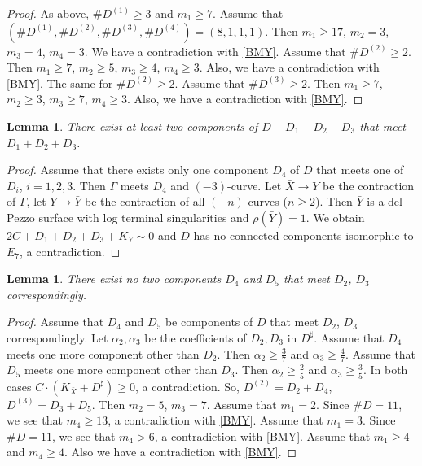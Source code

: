 \documentclass[10pt,oneside,reqno]{amsart}
\newtheorem{lemma}[theorem]{Lemma}
\theoremstyle{definition}
\theoremstyle{remark}
\numberwithin{equation}{section}
\begin{document}
\begin{proof}
As above, $\# D^{(1)}\geq 3$ and $m_1\geq 7$. Assume that $(\# D^{(1)},\# D^{(2)},\# D^{(3)},\# D^{(4)})=(8,1,1,1)$. Then $m_1\geq 17$, $m_2=3$, $m_3=4$, $m_4=3$. We have a contradiction with \ref{BMY}. Assume that $\# D^{(2)}\geq 2$. Then $m_1\geq 7$, $m_2\geq 5$, $m_3\geq 4$, $m_4\geq 3$. Also, we have a contradiction with \ref{BMY}. The same for $\# D^{(2)}\geq 2$. Assume that $\# D^{(3)}\geq 2$. Then $m_1\geq 7$, $m_2\geq 3$, $m_3\geq 7$, $m_4\geq 3$. Also, we have a contradiction with \ref{BMY}.
\end{proof}

\begin{lemma}
\label{Case234-4}
There exist at least two components of $D-D_1-D_2-D_3$ that meet $D_1+D_2+D_3$.
\end{lemma}

\begin{proof}
Assume that there exists only one component $D_4$ of $D$ that meets one of $D_i$, $i=1,2,3$. Then $\Gamma$ meets $D_4$ and $(-3)$-curve. Let $\bar{X}\rightarrow Y$ be the contraction of $\Gamma$, let $Y\rightarrow\bar{Y}$ be the contraction of all $(-n)$-curves ($n\geq 2$). Then $\bar{Y}$ is a del Pezzo surface with log terminal singularities and $\rho(\bar{Y})=1$. We obtain $2C+D_1+D_2+D_3+K_{Y}\sim 0$ and $D$ has no connected components isomorphic to $E_7$, a contradiction.
\end{proof}

\begin{lemma}
\label{Case234-5}
There exist no two components $D_4$ and $D_5$ that meet $D_2$, $D_3$ correspondingly.
\end{lemma}

\begin{proof}
Assume that $D_4$ and $D_5$ be components of $D$ that meet $D_2$, $D_3$ correspondingly. Let $\alpha_2,\alpha_3$ be the coefficients of $D_2, D_3$ in $D^{\sharp}$. Assume that $D_4$ meets one more component other than $D_2$. Then $\alpha_2\geq\frac{3}{7}$ and $\alpha_3\geq\frac{4}{7}$. Assume that $D_5$ meets one more component other than $D_3$. Then $\alpha_2\geq\frac{2}{5}$ and $\alpha_3\geq\frac{3}{5}$. In both cases $C\cdot(K_{\bar{X}}+D^{\sharp})\geq 0$, a contradiction. So, $D^{(2)}=D_2+D_4$, $D^{(3)}=D_3+D_5$. Then $m_2=5$, $m_3=7$. Assume that $m_1=2$. Since $\#D=11$, we see that $m_4\geq 13$, a contradiction with \ref{BMY}. Assume that  $m_1=3$. Since $\#D=11$, we see that $m_4>6$, a contradiction with \ref{BMY}.  Assume that $m_1\geq 4$ and $m_4 \geq 4$. Also we have a contradiction with \ref{BMY}.
\end{proof}
\end{document}
